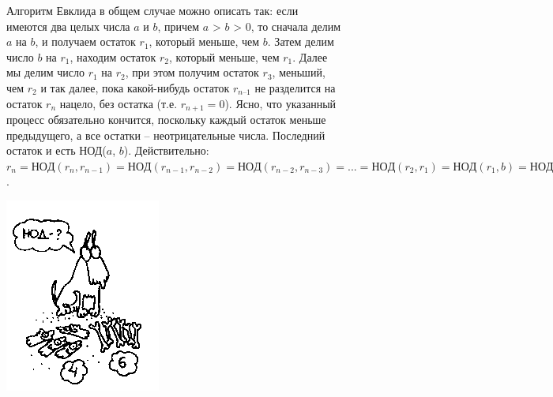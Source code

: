 \begin{figure}[H]
\begin{minipage}{0.74\linewidth}
Алгоритм Евклида в общем случае можно описать так: если имеются два целых числа $a$ и $b$, причем $a$ > $b$ > 0, то сначала делим $a$ на $b$, и получаем остаток $r_1$, который меньше, чем $b$. Затем делим число $b$ на $r_1$, находим остаток $r_2$, который меньше, чем $r_1$. Далее мы делим число $r_1$ на $r_2$, при этом получим остаток $r_3$, меньший, чем $r_2$ и так далее, пока какой-нибудь остаток $r_{n – 1}$ не разделится на остаток $r_n$ нацело, без остатка (т.е. $r_{n + 1} = 0$). Ясно, что указанный процесс обязательно кончится, поскольку каждый остаток меньше предыдущего, а все остатки -- неотрицательные числа. Последний остаток и есть НОД($a$, $b$). Действительно: 
\\
$r_n = НОД(r_n, r_{n - 1}) = НОД(r_{n - 1}, r_{n - 2}) = НОД(r_{n - 2}, r_{n - 3}) = ... = НОД(r_2, r_1) = НОД(r_1, b) = НОД(a, b)$.
\end{minipage}
\begin{minipage}{0.25\linewidth}
    \includegraphics[width=0.95\columnwidth]{img/11.2 img3.png}

\end{minipage}
\end{figure}
